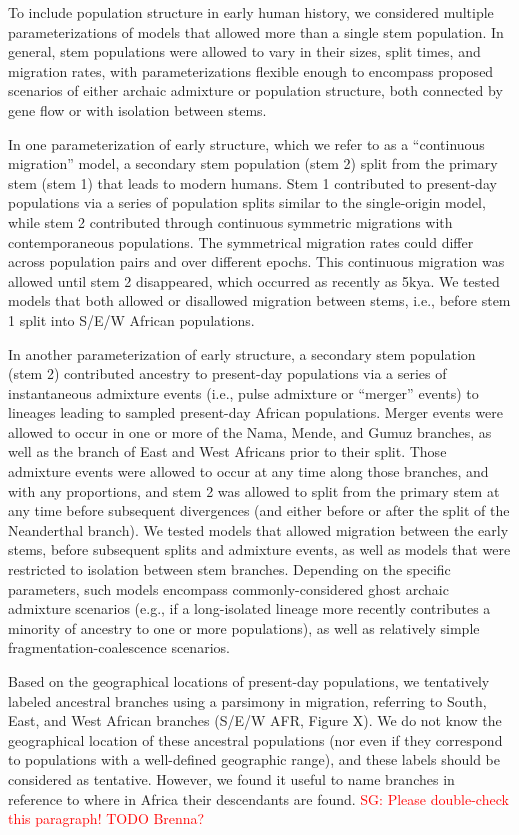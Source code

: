 \documentclass[]{article}
\newcommand{\sgcomment}[1]{{\textcolor{red}{SG: #1}}}
\begin{document}
To include population structure in early human history, we considered multiple
parameterizations of models that allowed more than a single stem population. In
general, stem populations were allowed to vary in their sizes, split times, and
migration rates, with parameterizations flexible enough to encompass proposed
scenarios of either archaic admixture or population structure, both connected
by gene flow or with isolation between stems.

In one parameterization of early structure, which we refer to as a “continuous
migration” model, a secondary stem population (stem 2) split from the primary
stem (stem 1) that leads to modern humans. Stem 1 contributed to present-day
populations via a series of population splits similar to the single-origin
model, while stem 2 contributed through continuous symmetric migrations with
contemporaneous populations. The symmetrical migration rates could differ
across population pairs and over different epochs. This continuous migration
was allowed until stem 2 disappeared, which occurred as recently as 5kya. We
tested models that both allowed or disallowed migration between stems, i.e.,
before stem 1 split into S/E/W African populations.

In another parameterization of early structure, a secondary stem population
(stem 2) contributed ancestry to present-day populations via a series of
instantaneous admixture events (i.e., pulse admixture or “merger” events) to
lineages leading to sampled present-day African populations. Merger events were
allowed to occur in one or more of the Nama, Mende, and Gumuz branches, as well
as the branch of East and West Africans prior to their split. Those admixture
events were allowed to occur at any time along those branches, and with any
proportions, and stem 2 was allowed to split from the primary stem at any time
before subsequent divergences (and either before or after the split of the
Neanderthal branch). We tested models that allowed migration between the early
stems, before subsequent splits and admixture events, as well as models that
were restricted to isolation between stem branches. Depending on the specific
parameters, such models encompass commonly-considered ghost archaic admixture
scenarios (e.g., if a long-isolated lineage more recently contributes a
minority of ancestry to one or more populations), as well as relatively simple
fragmentation-coalescence scenarios.

Based on the geographical locations of present-day populations, we tentatively
labeled ancestral branches using a parsimony in migration, referring to South,
East, and West African branches (S/E/W AFR, Figure X). We do not know the
geographical location of these ancestral populations (nor even if they
correspond to populations with a well-defined geographic range), and these
labels should be considered as tentative. However, we found it useful to name
branches in reference to where in Africa their descendants are found.
\sgcomment{Please double-check this paragraph! TODO Brenna?}
\end{document}
